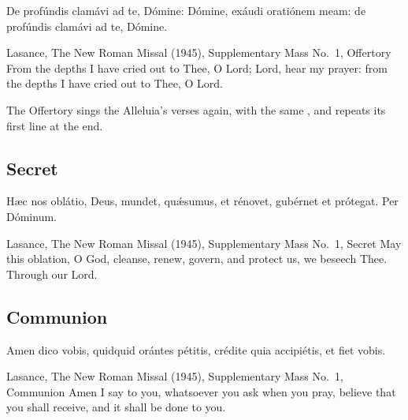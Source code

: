 
\begin{latinproper}
De profúndis clamávi ad te, Dómine: Dómine, exáudi oratiónem meam: de
profúndis clamávi ad te, Dómine.
\end{latinproper}

\begin{englishwitness}{Lasance, The New Roman Missal (1945), Supplementary Mass No.~1, Offertory}
From the depths I have cried out to Thee, O Lord; Lord, hear my prayer: from
the depths I have cried out to Thee, O Lord.
\end{englishwitness}

\noindent The Offertory sings the Alleluia's verses again, with the same
, and repeats its first line at the end.

\subsection{Secret}
\label{proper-secret}


\begin{latinproper}
Hæc nos oblátio, Deus, mundet, quǽsumus, et rénovet, gubérnet et prótegat.
Per Dóminum.
\end{latinproper}

\begin{englishwitness}{Lasance, The New Roman Missal (1945), Supplementary Mass No.~1, Secret}
May this oblation, O God, cleanse, renew, govern, and protect us, we beseech
Thee. Through our Lord.
\end{englishwitness}

\subsection{Communion}
\label{proper-communion}


\begin{latinproper}
Amen dico vobis, quidquid orántes pétitis, crédite quia accipiétis, et fiet
vobis.
\end{latinproper}

\begin{englishwitness}{Lasance, The New Roman Missal (1945), Supplementary Mass No.~1, Communion}
Amen I say to you, whatsoever you ask when you pray, believe that you shall
receive, and it shall be done to you.
\end{englishwitness}


